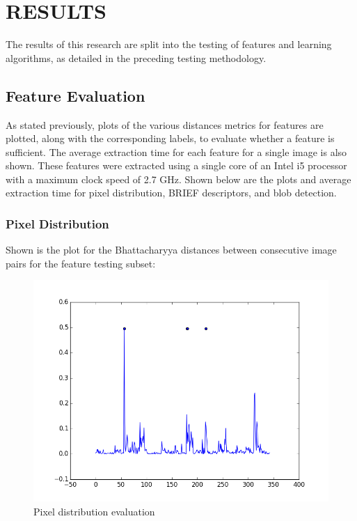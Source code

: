 %
%
%



\chapter{RESULTS}

The results of this research are split into the testing of features and learning algorithms, as detailed in the preceding testing methodology.

\section{Feature Evaluation}
As stated previously, plots of the various distances metrics for features are plotted, along with the corresponding labels, to evaluate whether a feature is sufficient.
The average extraction time for each feature for a single image is also shown.
These features were extracted using a single core of an Intel i5 processor with a maximum clock speed of 2.7 GHz.
Shown below are the plots and average extraction time for pixel distribution, BRIEF descriptors, and blob detection.

\subsection{Pixel Distribution}
Shown is the plot for the Bhattacharyya distances between consecutive image pairs for the feature testing subset:

\begin{figure}[h]
\centering
\includegraphics[scale=.50]{figures/611bhattest}
\caption{Pixel distribution evaluation}
\label{fig:tamu-fig3}
\end{figure}

